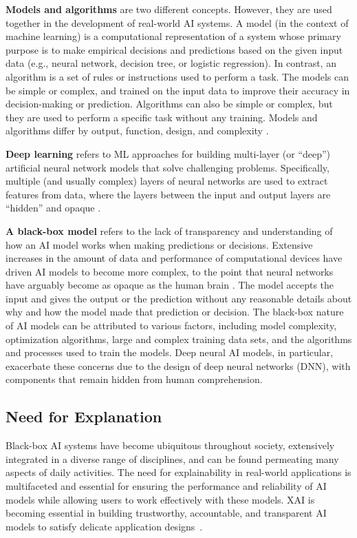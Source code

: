 \documentclass[final,5p,times,twocolumn]{elsarticle}
\begin{document}
\textbf{Models and algorithms} are two different concepts. However, they are used together in the development of real-world AI systems. A model (in the context of machine learning) is a computational representation of a system whose primary purpose is to make empirical decisions and predictions based on the given input data (e.g., neural network, decision tree, or logistic regression). In contrast, an algorithm is a set of rules or instructions used to perform a task. The models can be simple or complex, and trained on the input data to improve their accuracy in decision-making or prediction. Algorithms can also be simple or complex, but they are used to perform a specific task without any training. Models and algorithms differ by output, function, design, and complexity \cite{moor1978three}.

\textbf{Deep learning} refers to ML approaches for building multi-layer (or ``deep'') artificial neural network models that solve challenging problems. Specifically, multiple (and usually complex) layers of neural networks are used to extract features from data, where the layers between the input and output layers are ``hidden'' and opaque \cite{saxe2021if}.

\textbf{A black-box model} refers to the lack of transparency and understanding of how an AI model works when making predictions or decisions. Extensive increases in the amount of data and performance of computational devices have driven AI models to become more complex, to the point that neural networks have arguably become as opaque as the human brain \cite{castelvecchi2016can}. The model accepts the input and gives the output or the prediction without any reasonable details about why and how the model made that prediction or decision. The black-box nature of AI models can be attributed to various factors, including model complexity, optimization algorithms, large and complex training data sets, and the algorithms and processes used to train the models. Deep neural AI models, in particular, exacerbate these concerns due to the design of deep neural networks (DNN), with components that remain hidden from human comprehension.


\subsection{Need for Explanation}
Black-box AI systems have become ubiquitous throughout society, extensively integrated in a diverse range of disciplines, and can be found permeating many aspects of daily activities. The need for explainability in real-world applications is multifaceted and essential for ensuring the performance and reliability of AI models while allowing users to work effectively with these models. XAI is becoming essential in building trustworthy, accountable, and transparent AI models to satisfy delicate application designs~\cite{doran2017does, angelov2021explainable}.
\end{document}
